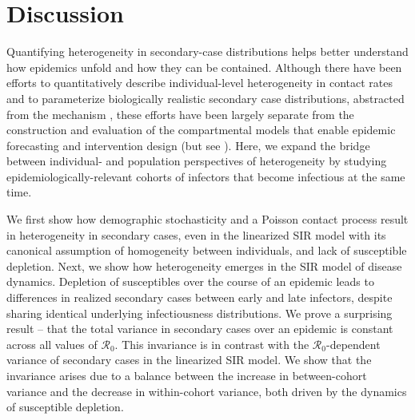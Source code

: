 \newpage
\section{Discussion}


Quantifying heterogeneity in secondary-case distributions helps better understand how epidemics unfold and how they can be contained. Although there have been efforts to quantitatively describe individual-level heterogeneity in contact rates \cite{woolhouse1997heterogeneities} and to parameterize biologically realistic secondary case distributions, abstracted from the mechanism \cite{lloydsmith2005superspreading}, these efforts have been largely separate from the construction and evaluation of the compartmental models that enable epidemic forecasting and intervention design (but see \cite{meehan2023replicating}). Here, we expand the bridge between individual- and population perspectives of heterogeneity by studying epidemiologically-relevant cohorts of infectors that become infectious at the same time.

We first show how demographic stochasticity and a Poisson contact process result in heterogeneity in secondary cases, even in the linearized SIR model with its canonical assumption of homogeneity between individuals, and lack of susceptible depletion. Next, we show how heterogeneity emerges in the SIR model of disease dynamics. Depletion of susceptibles over the course of an epidemic leads to differences in realized secondary cases between early and late infectors, despite sharing identical underlying infectiousness distributions. We prove a surprising result -- that the total variance in secondary cases over an epidemic is constant across all values of $\mathcal{R}_0$. This invariance is in contrast with the $\mathcal{R}_0$-dependent variance of secondary cases in the linearized SIR model. We show that the invariance arises due to a balance between the increase in between-cohort variance and the decrease in within-cohort variance, both driven by the dynamics of susceptible depletion. 

